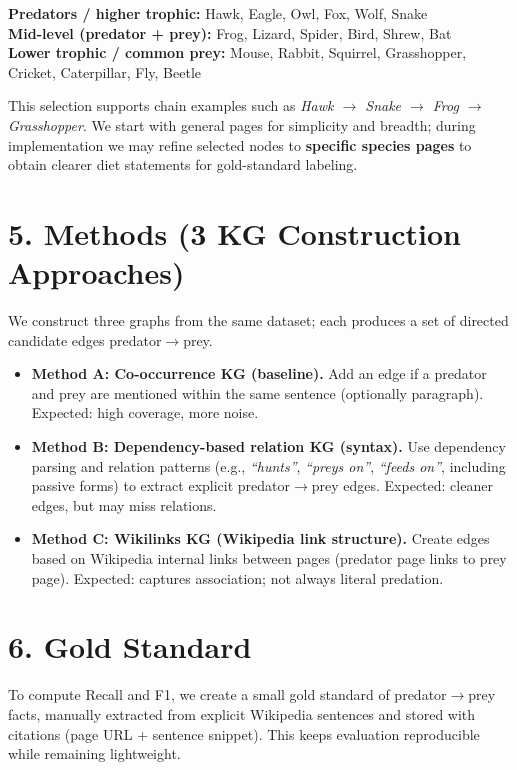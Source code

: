 \documentclass[11pt,a4paper]{article}
\begin{document}
\textbf{Predators / higher trophic:} Hawk, Eagle, Owl, Fox, Wolf, Snake \\
\textbf{Mid-level (predator + prey):} Frog, Lizard, Spider, Bird, Shrew, Bat \\
\textbf{Lower trophic / common prey:} Mouse, Rabbit, Squirrel, Grasshopper, Cricket, Caterpillar, Fly, Beetle

This selection supports chain examples such as \textit{Hawk $\rightarrow$ Snake $\rightarrow$ Frog $\rightarrow$ Grasshopper}. We start with general pages for simplicity and breadth; during implementation we may refine selected nodes to \textbf{specific species pages} to obtain clearer diet statements for gold-standard labeling.

\section*{5. Methods (3 KG Construction Approaches)}
We construct three graphs from the same dataset; each produces a set of directed candidate edges predator$\rightarrow$prey.

\begin{itemize}[leftmargin=*,itemsep=0.25em]
  \item \textbf{Method A: Co-occurrence KG (baseline).} Add an edge if a predator and prey are mentioned within the same sentence (optionally paragraph). Expected: high coverage, more noise.
  \item \textbf{Method B: Dependency-based relation KG (syntax).} Use dependency parsing and relation patterns (e.g., \textit{``hunts''}, \textit{``preys on''}, \textit{``feeds on''}, including passive forms) to extract explicit predator$\rightarrow$prey edges. Expected: cleaner edges, but may miss relations.
  \item \textbf{Method C: Wikilinks KG (Wikipedia link structure).} Create edges based on Wikipedia internal links between pages (predator page links to prey page). Expected: captures association; not always literal predation.
\end{itemize}

\section*{6. Gold Standard}
To compute Recall and F1, we create a small gold standard of predator$\rightarrow$prey facts, manually extracted from explicit Wikipedia sentences and stored with citations (page URL + sentence snippet). This keeps evaluation reproducible while remaining lightweight.
\end{document}
